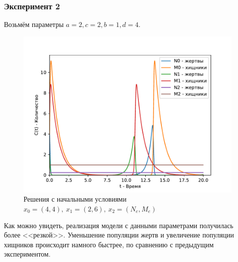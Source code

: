         \subsubsection{Эксперимент 2}
        Возьмём параметры $a = 2, c = 2, b = 1, d = 4$.
        \begin{figure}[H]
            \centering
            \includegraphics[width=15cm]{pictures/population2.pdf}
            \caption{Решения с начальными условиями $x_0=(4,4), ~ x_1 = (2,6), ~ x_2 = (N_e, M_e)$}
        \end{figure}
        Как можно увидеть, реализация модели с данными параметрами получилась более <<резкой>>. Уменьшение популяции жертв и увеличение популяции хищников происходит намного быстрее, по сравнению с предыдущим экспериментом.

